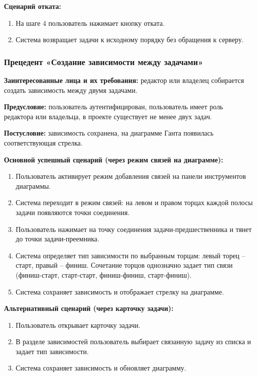 \textbf{Сценарий отката:}
\begin{enumerate}
    \item На шаге 4 пользователь нажимает кнопку отката.
    \item Система возвращает задачи к исходному порядку без обращения к серверу.
\end{enumerate}

\subsubsection{Прецедент «Создание зависимости между задачами»}

\textbf{Заинтересованные лица и их требования:} редактор или владелец собирается создать зависимость между двумя задачами.

\textbf{Предусловие:} пользователь аутентифицирован, пользователь имеет роль редактора или владельца, в проекте существует не менее двух задач.

\textbf{Постусловие:} зависимость сохранена, на диаграмме Ганта появилась соответствующая стрелка.

\textbf{Основной успешный сценарий (через режим связей на диаграмме):}
\begin{enumerate}
    \item Пользователь активирует режим добавления связей на панели инструментов диаграммы.
    \item Система переходит в режим связей: на левом и правом торцах каждой полосы задачи появляются точки соединения.
    \item Пользователь нажимает на точку соединения задачи-предшественника и тянет до точки задачи-преемника.
    \item Система определяет тип зависимости по выбранным торцам: левый торец -- старт, правый -- финиш. Сочетание торцов однозначно задает тип связи (финиш-старт, старт-старт, финиш-финиш, старт-финиш).
    \item Система сохраняет зависимость и отображает стрелку на диаграмме.
\end{enumerate}

\textbf{Альтернативный сценарий (через карточку задачи):}
\begin{enumerate}
    \item Пользователь открывает карточку задачи.
    \item В разделе зависимостей пользователь выбирает связанную задачу из списка и задает тип зависимости.
    \item Система сохраняет зависимость и обновляет диаграмму.
\end{enumerate}

